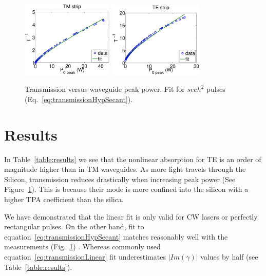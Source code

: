 \documentclass[10pt,letterpaper]{article}
\begin{document}
\begin{figure}[htb]
    \centering
    \includegraphics[width=0.39\textwidth]{imGamma_5p4366_V740TM25mm_big30}   
    \includegraphics[width=0.40\textwidth]{imGamma_117Wm-1_V740TE25mm_big30}
    \caption{Transmission versus waveguide peak power. Fit for $ sech^2 $ pulses (Eq.~\ref{eq:transmissionHypSecant}).}
    \label{fig:imGammaSamples}
\end{figure}


\section{Results}
In Table~\ref{table:results} we see that the nonlinear absorption for TE is an order of magnitude higher than in TM waveguides. As more light travels through the Silicon, transmission reduces drastically when increasing peak power (See Figure~\ref{fig:imGammaSamples}). This is because their mode is more confined into the silicon with a higher TPA coefficient than the silica.

We have demonstrated that the linear fit is only valid for CW lasers or perfectly rectangular pulses. On the other hand, fit to equation~\ref{eq:transmissionHypSecant} matches reasonably well with the measurements  (Fig.~\ref{fig:imGammaSamples}) . Whereas commonly used equation~\ref{eq:transmissionLinear} fit underestimates $|Im(\gamma)|$ values by half (see Table~\ref{table:results}).

\end{document}
